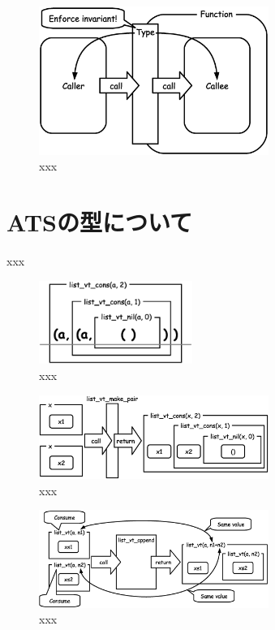 \documentclass{ipsjprosym}
\begin{document}
\begin{figure}[h]
\centering
\includegraphics[width=75mm]{draw/enforce_invariant.eps}
\caption{xxx}
\label{fig:enforce_invariant}
\end{figure}

\section{ATSの型について}

xxx

\begin{figure}[h]
\centering
\includegraphics[width=50mm]{draw/list_vt_type.eps}
\caption{xxx}
\label{fig:xxx}
\end{figure}

\begin{figure}[h]
\centering
\includegraphics[width=75mm]{draw/list_vt_make_pair.eps}
\caption{xxx}
\label{fig:xxx}
\end{figure}

\begin{figure}[h]
\centering
\includegraphics[width=75mm]{draw/list_vt_append.eps}
\caption{xxx}
\label{fig:list_vt_append}
\end{figure}
\end{document}
